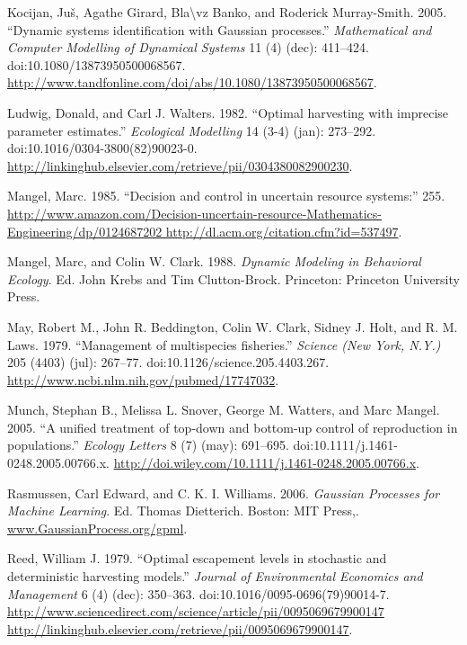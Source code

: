 \documentclass[author-year, review]{elsarticle} %
\begin{document}
Kocijan, Juš, Agathe Girard, Bla\textbackslash{}vz Banko, and Roderick
Murray-Smith. 2005. ``Dynamic systems identification with Gaussian
processes.'' \emph{Mathematical and Computer Modelling of Dynamical
Systems} 11 (4) (dec): 411--424. doi:10.1080/13873950500068567.
\url{http://www.tandfonline.com/doi/abs/10.1080/13873950500068567}.

Ludwig, Donald, and Carl J. Walters. 1982. ``Optimal harvesting with
imprecise parameter estimates.'' \emph{Ecological Modelling} 14 (3-4)
(jan): 273--292. doi:10.1016/0304-3800(82)90023-0.
\url{http://linkinghub.elsevier.com/retrieve/pii/0304380082900230}.

Mangel, Marc. 1985. ``Decision and control in uncertain resource
systems:'' 255.
\href{http://www.amazon.com/Decision-uncertain-resource-Mathematics-Engineering/dp/0124687202 http://dl.acm.org/citation.cfm?id=537497}{http://www.amazon.com/Decision-uncertain-resource-Mathematics-Engineering/dp/0124687202
http://dl.acm.org/citation.cfm?id=537497}.

Mangel, Marc, and Colin W. Clark. 1988. \emph{Dynamic Modeling in
Behavioral Ecology}. Ed. John Krebs and Tim Clutton-Brock. Princeton:
Princeton University Press.

May, Robert M., John R. Beddington, Colin W. Clark, Sidney J. Holt, and
R. M. Laws. 1979. ``Management of multispecies fisheries.''
\emph{Science (New York, N.Y.)} 205 (4403) (jul): 267--77.
doi:10.1126/science.205.4403.267.
\url{http://www.ncbi.nlm.nih.gov/pubmed/17747032}.

Munch, Stephan B., Melissa L. Snover, George M. Watters, and Marc
Mangel. 2005. ``A unified treatment of top-down and bottom-up control of
reproduction in populations.'' \emph{Ecology Letters} 8 (7) (may):
691--695. doi:10.1111/j.1461-0248.2005.00766.x.
\url{http://doi.wiley.com/10.1111/j.1461-0248.2005.00766.x}.

Rasmussen, Carl Edward, and C. K. I. Williams. 2006. \emph{Gaussian
Processes for Machine Learning}. Ed. Thomas Dietterich. Boston: MIT
Press,. \url{www.GaussianProcess.org/gpml}.

Reed, William J. 1979. ``Optimal escapement levels in stochastic and
deterministic harvesting models.'' \emph{Journal of Environmental
Economics and Management} 6 (4) (dec): 350--363.
doi:10.1016/0095-0696(79)90014-7.
\href{http://www.sciencedirect.com/science/article/pii/0095069679900147 http://linkinghub.elsevier.com/retrieve/pii/0095069679900147}{http://www.sciencedirect.com/science/article/pii/0095069679900147
http://linkinghub.elsevier.com/retrieve/pii/0095069679900147}.
\end{document}
